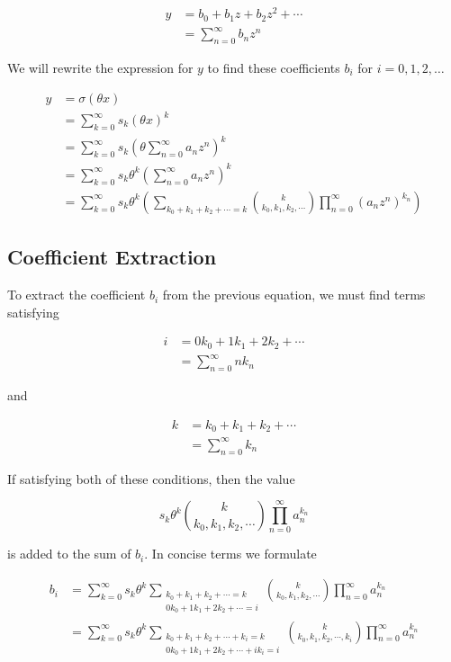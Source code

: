 \begin{align*}
    y
    &= b_0 + b_1 z + b_2 z^2 + \cdots \\
    &= \sum_{n=0}^{\infty} b_{n} z^{n}
\end{align*}

We will rewrite the expression for $y$ to find these coefficients $b_i$ for $i = 0, 1, 2, \ldots$

\begin{align*}
    y
    &= \sigma(\theta x) \\
    &= \sum_{k=0}^{\infty} s_k (\theta x)^k \\
    &= \sum_{k=0}^{\infty} s_k \left(\theta \sum_{n=0}^{\infty} a_{n} z^{n}\right)^{k} \\
    &= \sum_{k=0}^{\infty} s_k \theta^k \left(\sum_{n=0}^{\infty} a_{n} z^{n}\right)^{k} \\
    &= \sum_{k=0}^{\infty} s_k \theta^k \left(\sum_{k_0 + k_1 + k_2 + \cdots = k} \binom{k}{k_0, k_1, k_2, \cdots} \prod_{n=0}^{\infty} (a_n z^{n})^{k_n} \right)
\end{align*}

\subsection{Coefficient Extraction}

To extract the coefficient $b_i$ from the previous equation, we must find terms satisfying 

\begin{align*}
    i
    &= 0 k_0 + 1 k_1 + 2 k_2 + \cdots \\
    &= \sum_{n=0}^{\infty} n k_n
\end{align*}

and

\begin{align*}
    k
    &= k_0 + k_1 + k_2 + \cdots \\
    &= \sum_{n=0}^{\infty} k_n
\end{align*}

If satisfying both of these conditions, then the value

\begin{equation*}
    s_k \theta^k \binom{k}{k_0, k_1, k_2, \cdots} \prod_{n=0}^{\infty} a_n^{k_n}
\end{equation*}

is added to the sum of $b_i$. In concise terms we formulate

\begin{align*}
    b_i
    &= \sum_{k=0}^{\infty} s_k \theta^k \sum_{\substack{k_0 + k_1 + k_2 + \cdots = k \\ 0 k_0 + 1 k_1 + 2 k_2 + \cdots = i}} \binom{k}{k_0, k_1, k_2, \cdots} \prod_{n=0}^{\infty} a_n^{k_n} \\
    &= \sum_{k=0}^{\infty} s_k \theta^k \sum_{\substack{k_0 + k_1 + k_2 + \cdots + k_i = k \\ 0 k_0 + 1 k_1 + 2 k_2 + \cdots + i k_i = i}} \binom{k}{k_0, k_1, k_2, \cdots, k_i} \prod_{n=0}^{\infty} a_n^{k_n} 
\end{align*}

